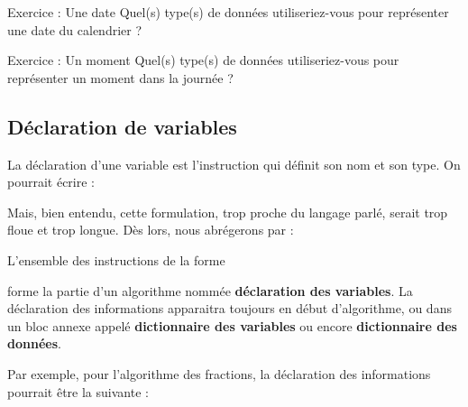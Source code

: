 			\begin{Emphase}{Exercice : Une date}
				Quel(s) type(s) de données utiliseriez-vous 
				pour représenter une date du calendrier ?
			\end{Emphase}

			\begin{Emphase}{Exercice : Un moment}
			Quel(s) type(s) de données utiliseriez-vous 
			pour représenter un moment dans la journée ?
			\end{Emphase}

		\subsection{Déclaration de variables}

			La déclaration d’une variable est l’instruction 
			qui définit son nom et son type. On pourrait écrire :

			
			Mais, bien entendu, cette formulation, trop proche du
			langage parlé, serait trop floue et trop longue. 
			Dès lors, nous abrégerons par :


			L’ensemble des instructions de la forme


			forme la partie d’un algorithme nommée 
			\textbf{déclaration des variables}. 
			La déclaration des informations apparaitra toujours en
			début d’algorithme, ou dans un bloc annexe appelé 
			\textbf{dictionnaire des variables} 
			ou encore \textbf{dictionnaire des données}.

			Par exemple, pour l’algorithme des fractions, la déclaration des
			informations pourrait être la suivante :


